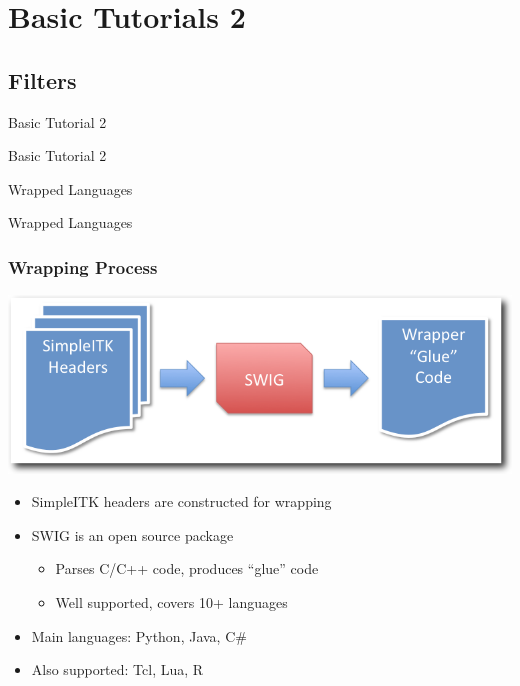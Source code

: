 \section{Basic Tutorials 2}

\subsection{Filters}

\begin{frame}{Basic Tutorial 2}
\fontsize{36pt}{36pt}\selectfont
\center
\begin{center}
Basic Tutorial 2
\end{center}
\end{frame}

\begin{frame}{Wrapped Languages}
\fontsize{36pt}{36pt}\selectfont
\center
\begin{center}
Wrapped Languages
\end{center}
\end{frame}

\begin{frame}[fragile]
\frametitle{Wrapping Process}
\begin{center}
  \includegraphics[width=.8\textwidth]{Images/WrappingProcess_shadow}
\end{center}
\begin{itemize}
  \item SimpleITK headers are constructed for wrapping
  \item SWIG is an open source package
  \begin{itemize}
    \item Parses C/C++ code, produces ``glue'' code
    \item Well supported, covers 10+ languages
  \end{itemize}
  \item Main languages: Python, Java, C\#
  \item Also supported: Tcl, Lua, R
\end{itemize}
\end{frame}

